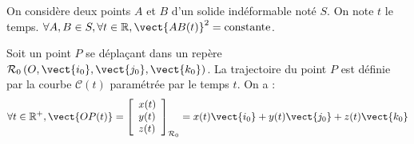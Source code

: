 \def\xxactivite{Cours}
\def\xxauteur{\textsl{Xavier Pessoles}}

\fichetrue
\proftrue
\tdfalse
\coursfalse

\def\xxnumpartie{Rév -- Cin}
\def\xxpartie{Modéliser le comportement cinématique des systèmes mécaniques}
\def\xxnumchapitre{Révision 1 \vspace{.2cm}}
\def\xxchapitre{\hspace{.12cm} Modélisation cinématique }
\def\xxpied{%
Révision cinématique -- Modélisation cinématique\\
Fiche 2 -- \xxactivite%
}


\def\xxcompetences{%
\textsl{%
\textbf{Savoirs et compétences :}\\
}}


\iflivret

\else

\fi
\setlength{\columnseprule}{.1pt}

\vspace{2cm}
\pagestyle{fancy}
\thispagestyle{plain}

\begin{defi} 
On considère deux points $A$ et $B$ d'un solide indéformable noté $S$. On note $t$ le temps. $
\forall A,B \in S, \forall t\in \mathbb{R}, \vect{AB(t)}^2 = \text{constante}
$.

\end{defi}

\begin{defi} 

Soit un point $P$ se déplaçant dans un repère $\mathcal{R}_0 \left(O,\vect{i_0},\vect{j_0},\vect{k_0} \right)$. La trajectoire du point $P$ est définie par la courbe $\mathcal{C}(t)$ paramétrée par le temps $t$. On a : 
$$
\forall t\in \mathbb{R}^+, \vect{OP(t)}=
\left[
\begin{array}{l}
x(t)\\
y(t)\\
z(t)\\
\end{array}
\right]_{\mathcal{R}_0}
=x(t)\vect{i_0}+y(t)\vect{j_0}+z(t)\vect{k_0}
$$
\end{defi}



